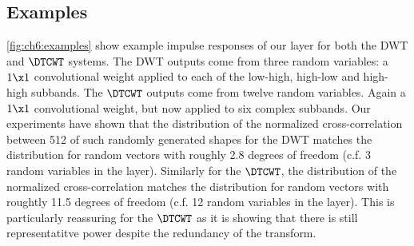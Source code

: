 \begin{figure}[t!]
  \centering
  \subfloat[]{%
    \resizebox{\textwidth}{!} {}
    \label{fig:ch6:dwt_blk_diagram}
  }\newline
  \vspace{1cm}
  \subfloat[]{%
    \resizebox{\textwidth}{!} {}
    \label{fig:ch6:dtcwt_blk_diagram}
  }
  \label{fig:ch6:block_diagrams}
\end{figure}

\subsection{Examples}
\autoref{fig:ch6:examples} show example impulse responses of our layer for both
the DWT and $\DTCWT$ systems. The DWT outputs come from three random variables: a $1\x 1$ 
convolutional weight applied to each of the low-high, high-low and high-high
subbands. The $\DTCWT$ outputs come from twelve random variables. Again a $1\x
1$ convolutional weight, but now applied to six complex subbands. 
Our experiments have shown that the distribution of the normalized
cross-correlation between 512 of such randomly generated shapes for the DWT matches the
distribution for random vectors with roughly 2.8 degrees of freedom (c.f. 3
random variables in the layer). Similarly for the $\DTCWT$, the distribution of
the normalized cross-correlation matches the distribution for random vectors
with roughtly 11.5 degrees of freedom (c.f. 12 random variables in the layer).
This is particularly reassuring for the $\DTCWT$ as it is showing that there is
still representatitve power despite the redundancy of the transform.

